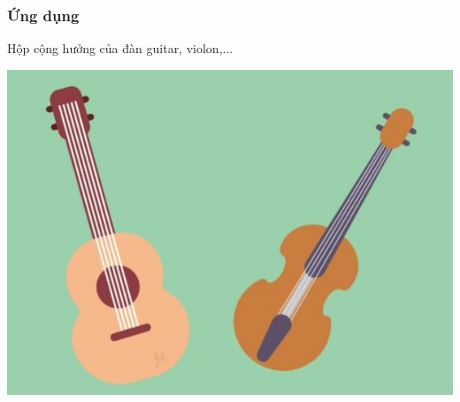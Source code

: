 \subsubsection{Ứng dụng}
Hộp cộng hưởng của đàn guitar, violon,...
\begin{center}
	\includegraphics[scale=0.5]{../figs/VN12-PH-05-L-004-2-V2-02.jpg}
\end{center}
